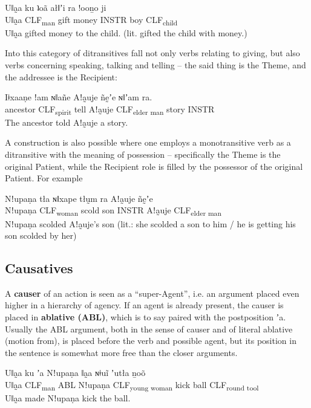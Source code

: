 \documentclass[11pt,a5paper]{book}
\newcommand{\qcn}[1]{\textcolor{AccentText}{\large#1}}
\newcommand{\grammsc}[1]{\textsc{#1}}
\newcommand{\CLF}[1]{\grammsc{CLF}\textsubscript{#1}}
\newcommand{\INSTR}{\grammsc{INSTR}}
\begin{document}
\begin{exe}
\ex
\gll Uǁa̰a ku ʇoã ałǁʼi ra  !ooṉo 	ji\\
Uǁa̰a \CLF{man} gift money INSTR boy \CLF{child}\\
\glt Uǁa̰a gifted money to the child. (lit. gifted the child with money.)
\end{exe}

Into this category of ditransitives fall not only verbs relating to giving, but also verbs concerning speaking, talking and telling -- the said thing is the Theme, and the addressee is the Recipient:

\begin{exe}
\ex
\gll Iǂxaaṇe ǃam ɴǁañe Aǃa̰uje ñḛʼe ɴǁʼam ra.\\
ancestor \CLF{spirit} tell Aǃa̰uje \CLF{elder man} story  \INSTR \\
\glt The ancestor told Aǃa̰uje a story.
\end{exe}

A construction is also possible where one employs a monotransitive verb as a ditransitive with the meaning of possession -- specifically the Theme is the original Patient, while the Recipient role is filled by the possessor of the original Patient. For example

\begin{exe}
	\ex
	\gll Nǃupaṇa 	tła ɴǁxape tłṵm ra  Aǃa̰uje ñḛʼe 	 \\
		Nǃupaṇa 	\CLF{woman} 	scold son \INSTR{} Aǃa̰uje \CLF{elder man}\\
	\glt Nǃupaṇa scolded Aǃa̰uje's son  (lit.: she scolded a son to him / he is getting his son scolded by her)
\end{exe}


\subsection{Causatives}

A \textbf{causer} of an action is seen as a ``super-Agent'', i.e. an argument placed even higher in a hierarchy of agency. If an agent is already present, the causer is placed in \textbf{ablative (ABL)}, which is to say paired with the postposition \qcn{ʼa}. Usually the ABL argument, both in the sense of causer and of literal ablative (motion from), is placed before the verb and possible agent, but its position in the sentence is somewhat more free than the closer arguments.

\begin{exe}
\ex
\gll Uǁa̰a ku ʼa Nǃupaṇa ǁa̰a ɴǂuĩ 	 	ʼutła 	ṉoõ\\
Uǁa̰a \CLF{man} ABL Nǃupaṇa \CLF{young woman} kick ball \CLF{round tool}\\
\glt Uǁa̰a made Nǃupaṇa kick the ball.
\end{exe}
\end{document}
